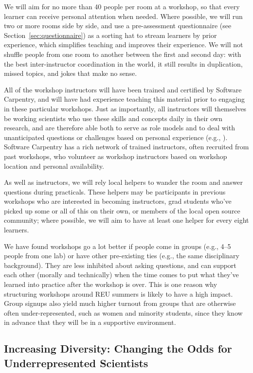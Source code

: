 \documentclass{proposalnsf}
\newlength{\up}
\begin{document}
We will aim for no more than 40 people per room at a workshop, so that
every learner can receive personal attention when needed.  Where
possible, we will run two or more rooms side by side, and use a
pre-assessment questionnaire (see Section~\ref{sec:questionnaire}) as a sorting hat to stream learners by
prior experience, which simplifies teaching and improves their
experience.  We will not shuffle people from one room to
another between the first and second day: with the best
inter-instructor coordination in the world, it still results in
duplication, missed topics, and jokes that make no sense.

All of the workshop instructors will have been trained and certified
by Software Carpentry, and will have had experience teaching this
material prior to engaging in these particular workshops.  Just as
importantly, all instructors will themselves be working scientists who use these
skills and concepts daily in their own research, and are therefore
able both to serve as role models and to deal with unanticipated
questions or challenges based on personal experience (e.g.,
\cite{ram2013}). Software Carpentry has a rich network of trained instructors, often recruited from past workshops, who volunteer as workshop instructors based on workshop location and personal availability. 

As well as instructors, we will rely local helpers to wander the room and
answer questions during practicals. These helpers may be participants in
previous workshops who are interested in becoming instructors, grad
students who've picked up some or all of this on their own, or members
of the local open source community; where possible, we will aim to have at
least one helper for every eight learners.

We have found workshops go a lot better if people come in groups (e.g., 4--5
people from one lab) or have other pre-existing ties (e.g., the same
disciplinary background). They are less inhibited about asking
questions, and can support each other (morally and technically) when
the time comes to put what they've learned into practice after the
workshop is over. This is one reason why structuring workshops around
REU summers is likely to have a high impact.
Group signups also yield much higher turnout from
groups that are otherwise often under-represented, such as women and
minority students, since they know in advance that they will be in a
supportive environment.

\subsection{Increasing Diversity: Changing the Odds for Underrepresented Scientists}
\label{sec:diversity}
\end{document}
